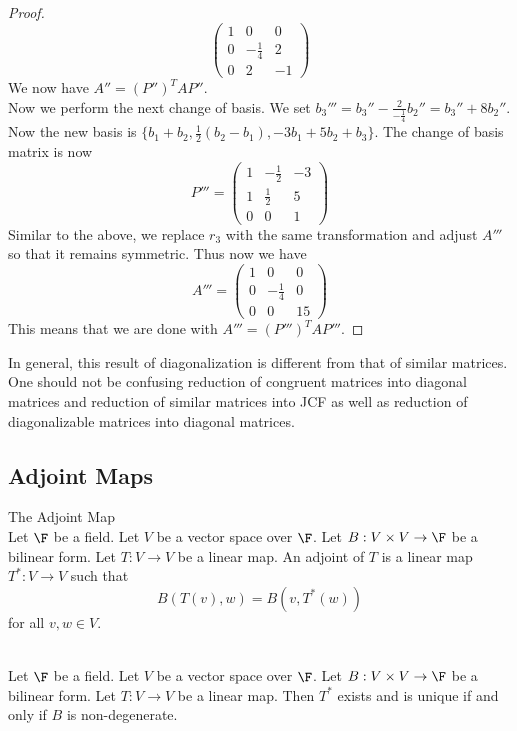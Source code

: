 \documentclass[a4paper]{article}
\begin{document}
\begin{eg}{}{}
\begin{proof}
$$\begin{pmatrix}
1 & 0 & 0\\
0 & -\frac{1}{4} & 2\\
0 & 2 & -1
\end{pmatrix}$$
We now have $A''=(P'')^TAP''$. \\
Now we perform the next change of basis. We set $b_3'''=b_3''-\frac{2}{-\frac{1}{4}}b_2''=b_3''+8b_2''$. Now the new basis is $\{b_1+b_2,\frac{1}{2}(b_2-b_1),-3b_1+5b_2+b_3\}$. The change of basis matrix is now $$P'''=\begin{pmatrix}
1 & -\frac{1}{2} & -3\\
1 & \frac{1}{2} & 5\\
0 & 0 & 1
\end{pmatrix}$$ Similar to the above, we replace $r_3$ with the same transformation and adjust $A'''$ so that it remains symmetric. Thus now we have $$A'''=\begin{pmatrix}
1 & 0 & 0\\
0 & -\frac{1}{4} & 0\\
0 & 0 & 15
\end{pmatrix}$$
This means that we are done with $A'''=(P''')^TAP'''$. 
\end{proof}
\end{eg}

In general, this result of diagonalization is different from that of similar matrices. One should not be confusing reduction of congruent matrices into diagonal matrices and reduction of similar matrices into JCF as well as reduction of diagonalizable matrices into diagonal matrices. 

\subsection{Adjoint Maps}
\begin{defn}{The Adjoint Map}{}\\
Let $\F$ be a field. Let $V$ be a vector space over $\F$. Let $B:V\times V\to\F$ be a bilinear form. Let $T:V\to V$ be a linear map. An adjoint of $T$ is a linear map $T^\ast:V\to V$ such that $$B(T(v),w)=B(v,T^\ast(w))$$ for all $v,w\in V$. 
\end{defn}

\begin{lmm}{}{}\\
Let $\F$ be a field. Let $V$ be a vector space over $\F$. Let $B:V\times V\to\F$ be a bilinear form. Let $T:V\to V$ be a linear map. Then $T^\ast$ exists and is unique if and only if $B$ is non-degenerate. 
\end{lmm}
\end{document}
